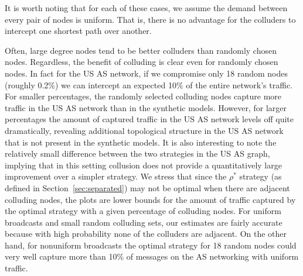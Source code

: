 \documentclass{comnet}
\begin{document}
It is worth noting that for each of these cases, we assume the demand between
every pair of nodes is uniform. That is, there is no advantage for the
colluders to intercept one shortest path over another.

Often, large degree nodes tend to be better colluders than randomly chosen
nodes. Regardless, the benefit of colluding is clear even for randomly chosen
nodes. In fact for the US AS network, if we compromise only 18 random nodes
(roughly 0.2\%) we can intercept an expected 10\% of the entire network's
traffic. For smaller percentages, the randomly selected colluding nodes capture
more traffic in the US AS network than in the synthetic models. However, for
larger percentages the amount of captured traffic in the US AS network levels
off quite dramatically, revealing additional topological structure in the US AS
network that is not present in the synthetic models. It is also interesting to
note the relatively small difference between the two strategies in the US AS
graph, implying that in this setting collusion does not provide a
quantitatively large improvement over a simpler strategy. We stress that since
the $\rho^*$ strategy (as defined in Section~\ref{sec:separated}) may not be
optimal when there are adjacent colluding nodes, the plots are lower bounds for
the amount of traffic captured by the optimal strategy with a given percentage
of colluding nodes. For uniform broadcasts and small random colluding sets, our
estimates are fairly accurate because with high probability none of the
colluders are adjacent. On the other hand, for nonuniform broadcasts the
optimal strategy for 18 random nodes could very well capture more than 10\% of
messages on the AS networking with uniform traffic.
\end{document}
